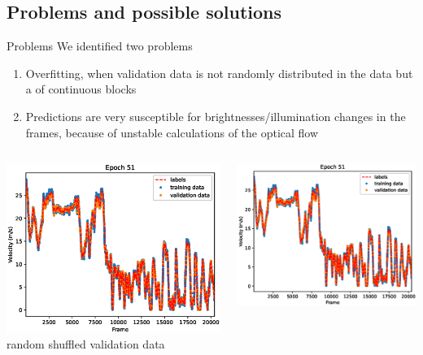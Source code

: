 \subsection{Problems and possible solutions}
\begin{frame}{Problems}
We identified two problems
\begin{enumerate}
	\item Overfitting, when validation data is not randomly distributed in the data but a of continuous blocks
	\item Predictions are very susceptible for brightnesses/illumination changes in the frames, because of unstable calculations of the optical flow
\end{enumerate}
\begin{columns}[c]
	\begin{column}{0.5\textwidth}
		\begin{center}
		\includegraphics[width=\textwidth]{imgs/siamese_performance.eps}
		random shuffled validation data
		\end{center}
	\end{column}
	\begin{column}{0.5\textwidth}
		\begin{center}
		\includegraphics[width=\textwidth]{imgs/siamese_performance.eps}

\end{center}
\end{column}
\end{columns}
\end{frame}
